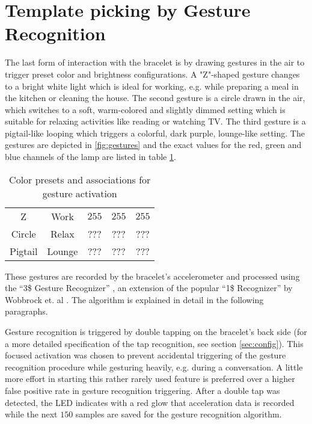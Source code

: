 \section{Template picking by Gesture Recognition}
The last form of interaction with the bracelet is by drawing gestures in the air to trigger preset color and brightness configurations. A "Z"-shaped gesture changes to a bright white light which is ideal for working, e.g. while preparing a meal in the kitchen or cleaning the house. The second gesture is a circle drawn in the air, which switches to a soft, warm-colored and slightly dimmed setting which is suitable for relaxing activities like reading or watching TV. The third gesture is a pigtail-like looping which triggers a colorful, dark purple, lounge-like setting. The gestures are depicted in \ref{fig:gestures} and the exact values for the red, green and blue channels of the lamp are listed in table \ref{tab:colors}.

\begin{table}
	\myfloatalign
	\begin{tabularx}{.8\textwidth}{ccccc}
		\toprule
		\tableheadline{Gesture} & \tableheadline{Association} & \tableheadline{Red} & \tableheadline{Green} & \tableheadline{Blue}\\ 
		\midrule
		Z & Work & $ 255 $ & $ 255 $ & $ 255 $\\
		Circle & Relax & ??? & ??? & ???\\
		Pigtail & Lounge & ??? & ??? & ???\\
		\bottomrule
	\end{tabularx}
	\caption[Color presets for gesture activation]{Color presets and associations for gesture activation}  \label{tab:colors}
\end{table}

These gestures are recorded by the bracelet's accelerometer and processed using the ``3\$ Gesture Recognizer'' \cite{Kratz2010}, an extension of the popular ``1\$ Recognizer'' by Wobbrock et. al \cite{Wobbrock2007}. The algorithm is explained in detail in the following paragraphs.

Gesture recognition is triggered by double tapping on the bracelet's back side (for a more detailed specification of the tap recognition, see section \ref{sec:config}). This focused activation was chosen to prevent accidental triggering of the gesture recognition procedure while gesturing heavily, e.g. during a conversation. A little more effort in starting this rather rarely used feature is preferred over a higher false positive rate in gesture recognition triggering. After a double tap was detected, the \ac{LED} indicates with a red glow that acceleration data is recorded while the next $150$ samples are saved for the gesture recognition algorithm.

